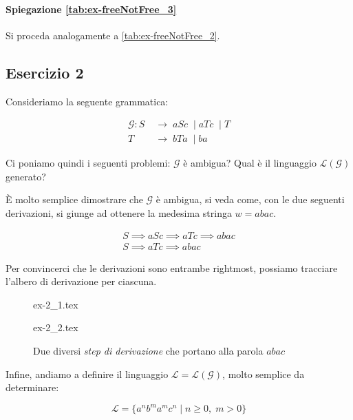 \documentclass[class=book, crop=false, oneside, 12pt]{standalone}
\begin{document}
\paragraph{Spiegazione \ref{tab:ex-freeNotFree_3}}
Si proceda analogamente a \ref{tab:ex-freeNotFree_2}.

\subsection*{Esercizio 2}
Consideriamo la seguente grammatica:

\begin{align*}
  \mathcal{G}:  S\; & \to\;  aSc\; \mid aTc\; \mid T \\
   T\; & \to\; bTa\; \mid ba
\end{align*}

\noindent Ci poniamo quindi i seguenti problemi: \(\mathcal{G}\) è ambigua? Qual è il linguaggio \(\mathcal{L(G)}\) generato?

È molto semplice dimostrare che \(\mathcal{G}\) è ambigua, si veda come, con le due seguenti derivazioni, si giunge ad ottenere la medesima stringa \(w = abac\).

\begin{gather*}
  S \implies aSc \implies aTc \implies abac \\
  S \implies aTc \implies abac
\end{gather*}

\noindent Per convincerci che le derivazioni sono entrambe rightmost, possiamo tracciare l'albero di derivazione per ciascuna.

\begin{figure}[H]
  \begin{minipage}{0.5\textwidth}
    \centering
    {ex-2_1.tex}
    \label{fig:ex-2_1}
  \end{minipage}
  \begin{minipage}{0.5\textwidth}
    \centering
    {ex-2_2.tex}
    \label{fig:ex-2_2}
  \end{minipage}
  \caption{Due diversi \emph{step di derivazione} che portano alla parola \(abac\)}
  \label{fig:ex-2}
\end{figure}

\noindent Infine, andiamo a definire il linguaggio \(\mathcal{L = L(G)}\), molto semplice da determinare:

\begin{equation*}
  \mathcal{L} = \{ a^n b^m a^m c^n \mid n \geq 0,\; m > 0 \}
\end{equation*}
\end{document}

